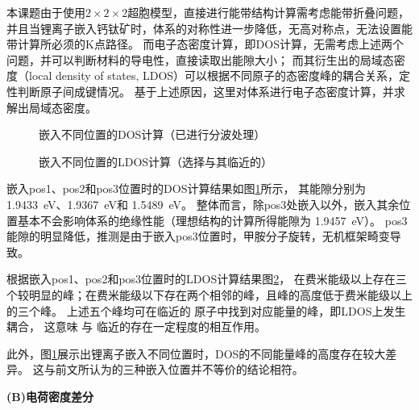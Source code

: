 本课题由于使用$2\times2\times2$超胞模型，直接进行能带结构计算需考虑能带折叠问题，
并且当锂离子嵌入钙钛矿时，体系的对称性进一步降低，无高对称点，无法设置能带计算所必须的K点路径。
而电子态密度计算，即DOS计算，无需考虑上述两个问题，并可以判断材料的导电性，直接读取出能隙大小；
而其衍生出的局域态密度（local density of states, LDOS）可以根据不同原子的态密度峰的耦合关系，定性判断原子间成键情况。
基于上述原因，这里对体系进行电子态密度计算，并求解出局域态密度。

\begin{figure}[htbp]
    \centering
    \caption{嵌入不同位置的DOS计算（已进行分波处理）}
    \label{fig:111-pos-dos}
\end{figure}

\begin{figure}[htbp]
    \centering
    \caption{嵌入不同位置的LDOS计算（选择与其临近的）}
    \label{fig:111-pos-ldos}
\end{figure}

嵌入pos1、pos2和pos3位置时的DOS计算结果如图\ref{fig:111-pos-dos}所示，
其能隙分别为 \SI{1.9433}{eV}、\SI{1.9367}{eV}和 \SI{1.5489}{eV}。
整体而言，除pos3处嵌入以外，嵌入其余位置基本不会影响体系的绝缘性能（理想结构的计算所得能隙为 \SI{1.9457}{eV}）。
pos3能隙的明显降低，推测是由于嵌入pos3位置时，甲胺分子旋转，无机框架畸变导致。

根据嵌入pos1、pos2和pos3位置时的LDOS计算结果图\ref{fig:111-pos-ldos}，
在费米能级以上存在三个较明显的峰；在费米能级以下存在两个相邻的峰，且峰的高度低于费米能级以上的三个峰。
上述五个峰均可在临近的 原子中找到对应能量的峰，即LDOS上发生耦合，
这意味 与 临近的存在一定程度的相互作用。

此外，图\ref{fig:111-pos-dos}展示出锂离子嵌入不同位置时，DOS的不同能量峰的高度存在较大差异。
这与前文所认为的三种嵌入位置并不等价的结论相符。

{\bf (B)电荷密度差分}

